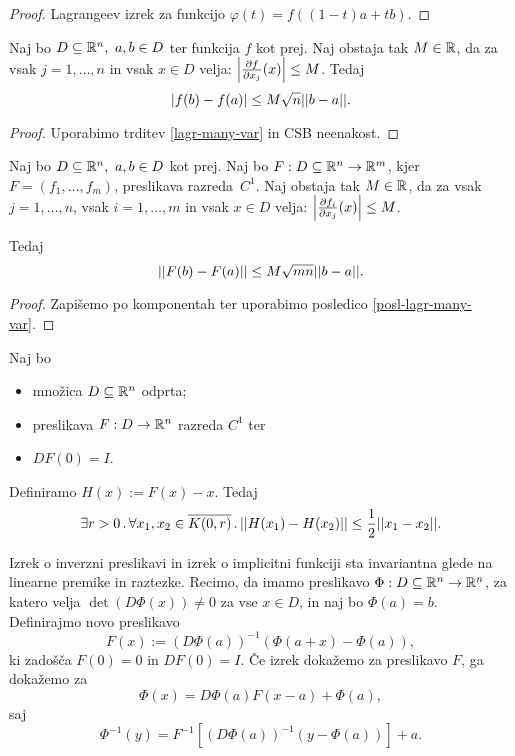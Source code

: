\begin{proof}
    Lagrangeev izrek za funkcijo $\varphi(t) = f((1-t)a + tb)$.
\end{proof}

\begin{posledica}
    \label{posl-lagr-many-var}
    Naj bo $D \subseteq \mathbb{R}^n, \ a,b \in D$ ter funkcija \(f\) kot prej. Naj obstaja tak $M \in \mathbb{R}$, da za vsak $j = 1, \ldots, n$ in vsak $x \in D$ velja: $\left|\frac{\partial f}{\partial x_j}(x)\right| \leq M$. Tedaj $$|f(b)-f(a)| \leq M \sqrt{n}||b-a||.$$
\end{posledica}

\begin{proof}
    Uporabimo trditev \ref{lagr-many-var} in CSB neenakost.
\end{proof}

\begin{posledica}
    Naj bo $D \subseteq \mathbb{R}^n, \ a,b \in D$ kot prej. Naj bo $F: D \subseteq \mathbb{R}^n \to \mathbb{R}^m$, kjer $F = (f_1, \ldots, f_m)$, preslikava razreda~$C^1$. Naj obstaja tak $M \in \mathbb{R}$, da za vsak $j = 1, \ldots, n$, vsak $i = 1, \ldots, m$ in vsak $x \in D$ velja: $\left|\frac{\partial f_i}{\partial x_j}(x)\right| \leq M$. 
    
    Tedaj $$||F(b) - F(a)|| \leq M \sqrt{mn} ||b - a||.$$
\end{posledica}

\begin{proof}
    Zapišemo po komponentah ter uporabimo posledico \ref{posl-lagr-many-var}.
\end{proof}

\begin{lema}
    \label{pomozna-trditev}
    Naj bo 
    \begin{itemize}
        \item množica $D \subseteq \mathbb{R}^n$ odprta;
        \item preslikava $F: D \to \mathbb{R}^n$ razreda $C^1$ ter
        \item \(DF(0) = I\).
    \end{itemize}
    Definiramo \(H(x) := F(x) - x\). Tedaj 
    \[\exists r > 0 \,.\, \forall x_1, x_2 \in \overline{K(0, r)} \,.\, ||H(x_1) - H(x_2)|| \leq \frac{1}{2} ||x_1 - x_2||.\]
\end{lema}

\begin{opomba}
    \label{poenastovitev}
    Izrek o inverzni preslikavi in izrek o implicitni funkciji sta invariantna glede na linearne premike in raztezke. Recimo, da imamo preslikavo \(\Phi: D \subseteq \mathbb{R}^n \to \mathbb{R}^n\), za katero velja \(\det(D\Phi(x)) \neq 0\) za vse \(x \in D\), in naj bo \(\Phi(a) = b\). Definirajmo novo preslikavo
    \[
        F(x) := (D\Phi(a))^{-1}(\Phi(a + x) - \Phi(a)),
    \]
    ki zadošča \(F(0) = 0\) in \(DF(0) = I\). Če izrek dokažemo za preslikavo \(F\), ga dokažemo za
    \[
        \Phi(x) = D\Phi(a) F(x - a) + \Phi(a),
    \]
    saj
    \[
        \Phi^{-1}(y) = F^{-1}[(D\Phi(a))^{-1}(y - \Phi(a))] + a.
    \]
\end{opomba}

